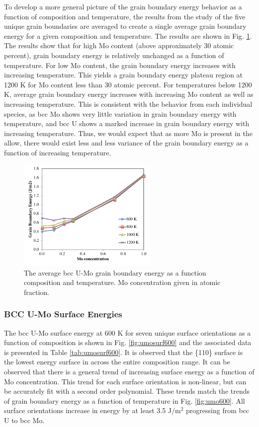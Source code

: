 \documentclass[review]{elsarticle}
\begin{document}
To develop a more general picture of the grain boundary energy behavior as a function of composition and temperature, the results from the study of the five unique grain boundaries are averaged to create a single average grain boundary energy for a given composition and temperature. The results are shown in Fig. \ref{fig:avgvsmo}. The results show that for high Mo content (above approximately 30 atomic percent), grain boundary energy is relatively unchanged as a function of temperature. For low Mo content, the grain boundary energy increases with increasing temperature. This yields a grain boundary energy plateau region at 1200 K for Mo content less than 30 atomic percent. For temperatures below 1200 K, average grain boundary energy increases with increasing Mo content as well as increasing temperature. This is consistent with the behavior from each individual species, as bcc Mo shows very little variation in grain boundary energy with temperature, and bcc U shows a marked increase in grain boundary energy with increasing temperature. Thus, we would expect that as more Mo is present in the allow, there would exist less and less variance of the grain boundary energy as a function of increasing temperature. 

\begin{figure}[h]
 \centering
 \includegraphics[width=0.6\textwidth]{avg_vs_moA.png} 
 \caption{The average bcc U-Mo grain boundary energy as a function composition and temperature. Mo concentration given in atomic fraction.}
 \label{fig:avgvsmo}
\end{figure}

\FloatBarrier

 
\subsubsection{BCC U-Mo Surface Energies}

The bcc U-Mo surface energy at 600 K for seven unique surface orientations as a function of composition is shown in Fig. \ref{fig:umosurf600} and the associated data is presented in Table \ref{tab:umosurf600}. It is observed that the \{110\} surface is the lowest energy surface in across the entire composition range. It can be observed that there is a general trend of increasing surface energy as a function of Mo concentration. This trend for each surface orientation is non-linear, but can be accurately fit with a second order polynomial. These trends match the trends of grain boundary energy as a function of temperature in Fig. \ref{fig:umo600}. All surface orientations increase in energy by at least 3.5 J/m$^{2}$ progressing from bcc U to bcc Mo. 
\end{document}
